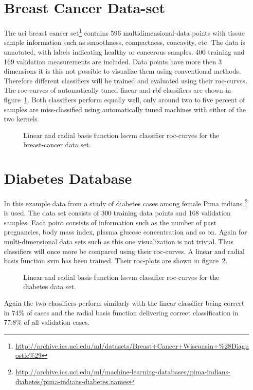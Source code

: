 \section{Breast Cancer Data-set}
The uci breast cancer set\footnote{\url{http://archive.ics.uci.edu/ml/datasets/Breast+Cancer+Wisconsin+\%28Diagnostic\%29}} contains 596 multidimensional-data points with tissue sample information such as smoothness, compactness, concavity, etc. The data is annotated, with labels indicating healthy or cancerous samples. 400 training and 169 validation measurements are included. Data points have more then 3 dimensions it is this not possible to visualize them using conventional methods. Therefore different classifiers will be trained and evaluated using their roc-curves. The roc-curves of automatically tuned linear and rbf-classifiers are shown in figure~\ref{fig:breastROC}. Both classifiers perform equally well, only around two to five percent of samples are miss-classified using automatically tuned machines with either of the two kernels. 
\begin{figure}


\caption{Linear and radial basis function lssvm classifier roc-curves for the breast-cancer data set.}
\label{fig:breastROC}
\end{figure}

\section{Diabetes Database}
In this example data from a study of diabetes cases among female Pima indians \footnote{\url{http://archive.ics.uci.edu/ml/machine-learning-databases/pima-indians-diabetes/pima-indians-diabetes.names}} is used. The data set consists of 300 training data points and 168 validation samples. Each point consists of information such as the number of past pregnancies, body mass index, plasma glucose concentration and so on. 
Again for multi-dimensional data sets such as this one visualization is not trivial. Thus classifiers will once more be compared using their roc-curves. A linear and radial basis function svm has been trained. Their roc-plots are shown in figure~\ref{fig:diabetesROC}. 
\begin{figure}


\caption{Linear and radial basis function lssvm classifier roc-curves for the diabetes data set.}
\label{fig:diabetesROC}
\end{figure}
Again the two classifiers perform similarly with the linear classifier being correct in 74\% of cases and the radial basis function delivering correct classification in  77.8\% of all validation cases.  
